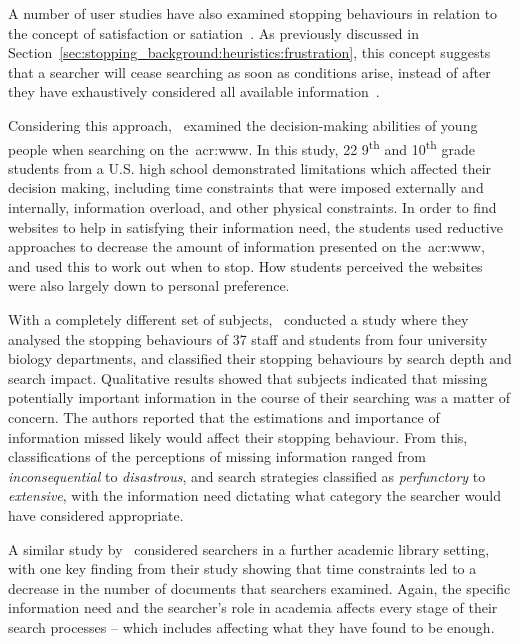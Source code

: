 A number of user studies have also examined stopping behaviours in relation to the concept of satisfaction or satiation~\citep{simon1955satiation}. As previously discussed in Section~\ref{sec:stopping_background:heuristics:frustration}, this concept suggests that a searcher will cease searching as soon as conditions arise, instead of after they have exhaustively considered all available information~\citep{march1994primer}.

Considering this approach,~\cite{agosto2002satisficing} examined the decision-making abilities of young people when searching on the~\gls{acr:www}. In this study, 22 9\textsuperscript{th} and 10\textsuperscript{th} grade students from a U.S. high school demonstrated limitations which affected their decision making, including time constraints that were imposed externally and internally, information overload, and other physical constraints. In order to find websites to help in satisfying their information need, the students used reductive approaches to decrease the amount of information presented on the~\gls{acr:www}, and used this to work out when to stop. How students perceived the websites were also largely down to personal preference.

With a completely different set of subjects,~\cite{mansourian2007search} conducted a study where they analysed the stopping behaviours of 37 staff and students from four university biology departments, and classified their stopping behaviours by search depth and search impact. Qualitative results showed that subjects indicated that missing potentially important information in the course of their searching was a matter of concern. The authors reported that the estimations and importance of information missed likely would affect their stopping behaviour. From this, classifications of the perceptions of missing information ranged from \emph{inconsequential} to \emph{disastrous}, and search strategies classified as \emph{perfunctory} to \emph{extensive}, with the information need dictating what category the searcher would have considered appropriate.

A similar study by~\cite{prabha2007enough} considered searchers in a further academic library setting, with one key finding from their study showing that time constraints led to a decrease in the number of documents that searchers examined. Again, the specific information need and the searcher's role in academia affects every stage of their search processes -- which includes affecting what they have found to be enough.

